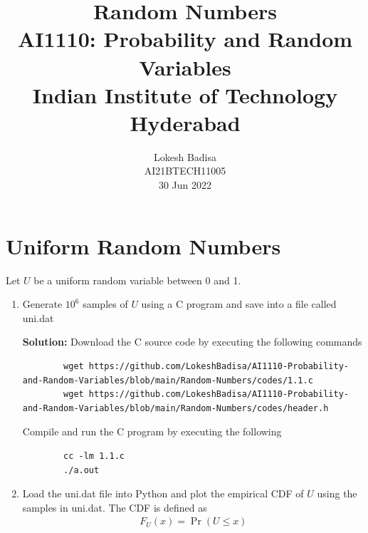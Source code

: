 \documentclass[journal,12pt,twocolumn]{IEEEtran}
\title{Random Numbers \\ \Large AI1110: Probability and Random Variables \\ \large Indian Institute of Technology Hyderabad}
\author{Lokesh Badisa \\ \normalsize AI21BTECH11005 \\ \vspace*{20pt} \normalsize  30 Jun 2022}
\newcommand{\solution}{\noindent \textbf{Solution: }}
\providecommand{\pr}[1]{\ensuremath{\Pr\left(#1\right)}}
\numberwithin{equation}{section}
\renewcommand\thesection{\arabic{section}}
\begin{document}
	\maketitle
	
	\section{Uniform Random Numbers}
	Let $U$ be a uniform random variable between 0 and 1.
	\begin{enumerate}[label=\thesection.\arabic*,ref=\thesection.\theenumi]
	\item Generate $10^6$ samples of $U$ using a C program and save into a file called uni.dat

	\solution Download the C source code by executing the following commands
	\begin{lstlisting}
		wget https://github.com/LokeshBadisa/AI1110-Probability-and-Random-Variables/blob/main/Random-Numbers/codes/1.1.c
		wget https://github.com/LokeshBadisa/AI1110-Probability-and-Random-Variables/blob/main/Random-Numbers/codes/header.h
	\end{lstlisting}
	Compile and run the C program by executing the following
	\begin{lstlisting}
		cc -lm 1.1.c
		./a.out
	\end{lstlisting}
	
	\item Load the uni.dat file into Python and plot the empirical CDF of $U$ using the samples in uni.dat. The CDF is defined as
	\begin{align}
		F_{U}(x) = \pr{U \le x}
	\end{align}


\end{enumerate}
\end{document}
